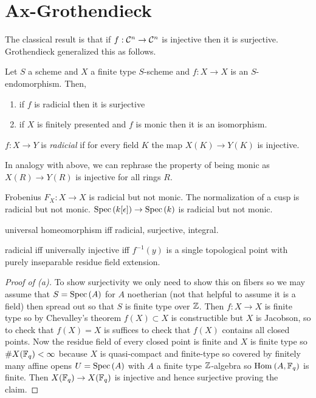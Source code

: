 \documentclass[12pt]{article}
\begin{document}
\section{Ax-Grothendieck}

\begin{rmk}
The classical result is that if $f : \mathcal{C}^n \to \mathcal{C}^n$ is injective then it is surjective. Grothendieck generalized this as follows.
\end{rmk}

\begin{theorem}
Let $S$ a scheme and $X$ a finite type $S$-scheme and $f : X \to X$ is an $S$-endomorphism. Then,
\begin{enumerate}
\item if $f$ is radicial then it is surjective
\item if $X$ is finitely presented and $f$ is monic then it is an isomorphism.
\end{enumerate}
\end{theorem}

\begin{defn}
$f : X \to Y$ is \textit{radicial} if for every field $K$ the map $X(K) \to Y(K)$ is injective.
\end{defn}

\begin{rmk}
In analogy with above, we can rephrase the property of being monic as $X(R) \to Y(R)$ is injective for all rings $R$.
\end{rmk}

\begin{example}
Frobenius $F_X : X \to X$ is radicial but not monic. The normalization of a cusp is radicial but not monic. $\mathrm{Spec}\left( k[\epsilon] \right) \to \mathrm{Spec}\left( k \right)$ is radicial but not monic.
\end{example}

\begin{rmk}
universal homeomorphism iff radicial, surjective, integral. 
\end{rmk}

\begin{rmk}
radicial iff universally injective iff $f^{-1}(y)$ is a single topological point with purely inseparable residue field extension.
\end{rmk}

\begin{proof}[Proof of (a)]
To show surjectivity we only need to show this on fibers so we may assume that $S = \mathrm{Spec}\left( A \right)$ for $A$ noetherian (not that helpful to assume it is a field) then spread out so that $S$ is finite type over $\mathbb{Z}$. Then $f : X \to X$ is finite type so by Chevalley's theorem $f(X) \subset X$ is constructible but $X$ is Jacobson, so to check that $f(X) = X$ is suffices to check that $f(X)$ contains all closed points. Now the residue field of every closed point is finite and $X$ is finite type so $\# X(\mathbb{F}_q) < \infty$ because $X$ is quasi-compact and finite-type so covered by finitely many affine opens $U = \mathrm{Spec}\left( A \right)$ with $A$ a finite type $\mathbb{Z}$-algebra so $\mathrm{Hom}_{} \left( A, \mathbb{F}_q \right)$ is finite. Then $X(\mathbb{F}_q) \to X(\mathbb{F}_q)$ is injective and hence surjective proving the claim. 
\end{proof}
\end{document}
